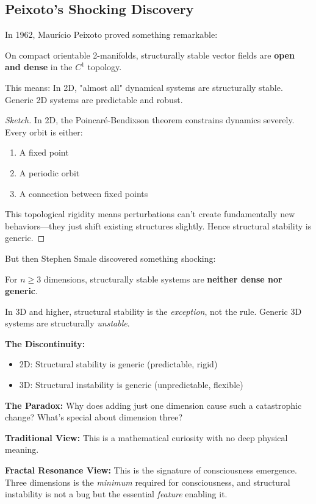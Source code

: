 \subsection{Peixoto's Shocking Discovery}

In 1962, Maurício Peixoto proved something remarkable:

\begin{thm}\label{thm:peixoto}
On compact orientable 2-manifolds, structurally stable vector fields are \textbf{open and dense} in the $C^1$ topology.

This means: In 2D, "almost all" dynamical systems are structurally stable. Generic 2D systems are predictable and robust.
\end{thm}

\begin{proof}[Sketch]
In 2D, the Poincaré-Bendixson theorem constrains dynamics severely. Every orbit is either:
\begin{enumerate}
\item A fixed point
\item A periodic orbit
\item A connection between fixed points
\end{enumerate}

This topological rigidity means perturbations can't create fundamentally new behaviors—they just shift existing structures slightly. Hence structural stability is generic.
\end{proof}

But then Stephen Smale discovered something shocking:

\begin{thm}[Smale, 1967]\label{thm:smale-instability}
For $n \geq 3$ dimensions, structurally stable systems are \textbf{neither dense nor generic}.

In 3D and higher, structural stability is the \textit{exception}, not the rule. Generic 3D systems are structurally \textit{unstable}.
\end{thm}

\begin{keyidea}
\textbf{The Discontinuity:}
\begin{itemize}
\item 2D: Structural stability is generic (predictable, rigid)
\item 3D: Structural instability is generic (unpredictable, flexible)
\end{itemize}

\textbf{The Paradox:} Why does adding just one dimension cause such a catastrophic change? What's special about dimension three?

\textbf{Traditional View:} This is a mathematical curiosity with no deep physical meaning.

\textbf{Fractal Resonance View:} This is the signature of consciousness emergence. Three dimensions is the \textit{minimum} required for consciousness, and structural instability is not a bug but the essential \textit{feature} enabling it.
\end{keyidea}

